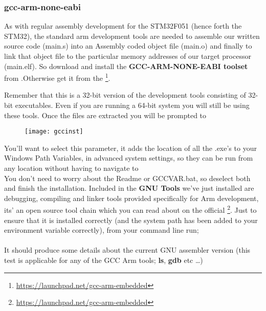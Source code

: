 \subsubsection{gcc-arm-none-eabi}
\label{subsec:gccinst}
As with regular assembly development for the STM32F051 (hence forth the STM32), the standard arm development tools are needed to assemble our written source code (main.s) into an Assembly coded object file (main.o) and finally to link that object file to the particular memory addresses of our target processor (main.elf). 
So download and install the \textbf{\color{Brown} GCC-ARM-NONE-EABI toolset} from \href{https://vula.uct.ac.za/x/m9Z91P}{\color{Blue} \underline{}}.Otherwise get it from the  \href{https://launchpad.net/gcc-arm-embedded}{\color{Blue}\underline{}}   \hspace{1pt}\footnote{\url{https://launchpad.net/gcc-arm-embedded}}.
\par
Remember that this is a 32-bit version of the development tools consisting of 32-bit executables. Even if you are running a 64-bit system you will still be using these tools. Once the files are extracted you will be prompted to 
\begin{figure}[hbtp]
\centering
\texttt{[image: gccinst]}
\end{figure}
\newpage
You'll want to select this parameter, it adds the location of all the .exe's to your Windows Path Variables, in advanced system settings, so they can be run from any location without having to navigate to 
\\
You don't need to worry about the Readme or GCCVAR.bat, so deselect both and finish the installation. Included in the \textbf{\color{Brown} GNU Tools} we've just installed are debugging, compiling and linker tools provided specifically for Arm development, its' an open source tool chain which you can read about on the official \href{https://launchpad.net/gcc-arm-embedded}{\color{Blue} \underline{}}\hspace{1pt}\footnote{\url{https://launchpad.net/gcc-arm-embedded}}. Just to ensure that it is installed correctly (and the system path has been added to your environment variable correctly), from your command line run;
\\
\\
It should produce some details about the current GNU assembler version (this test is applicable for any of the GCC Arm tools; \textbf{ls}, \textbf{gdb} etc \ldots)

